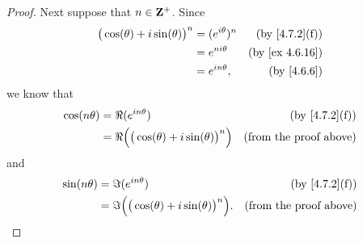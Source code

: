 \begin{proof}
  Next suppose that \(n \in \mathbf{Z}^+\).
  Since
  \begin{align*}
    \big(\cos(\theta) + i \sin(\theta)\big)^n & = (e^{i \theta})^n & \text{(by \cref{4.7.2}(f))}  \\
                                              & = e^{n i \theta}   & \text{(by \cref{ex 4.6.16})} \\
                                              & = e^{i n \theta},  & \text{(by \cref{4.6.6})}
  \end{align*}
  we know that
  \begin{align*}
    \cos(n \theta) & = \Re(e^{i n \theta})                                    & \text{(by \cref{4.7.2}(f))}   \\
                   & = \Re\Big(\big(\cos(\theta) + i \sin(\theta)\big)^n\Big) & \text{(from the proof above)}
  \end{align*}
  and
  \begin{align*}
    \sin(n \theta) & = \Im(e^{i n \theta})                                     & \text{(by \cref{4.7.2}(f))}   \\
                   & = \Im\Big(\big(\cos(\theta) + i \sin(\theta)\big)^n\Big). & \text{(from the proof above)}
  \end{align*}


\end{proof}
